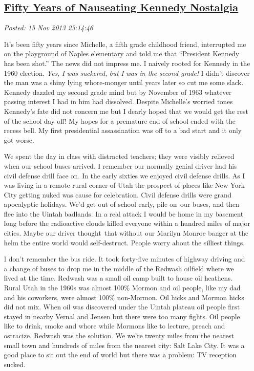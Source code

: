 %

\subsection*{\href{https://bakerjd99.wordpress.com/2013/11/15/fifty-years-of-nauseating-kennedy-nostalgia/}{Fifty Years of Nauseating Kennedy Nostalgia}}


\noindent\emph{Posted: 15 Nov 2013 23:14:46}
\vspace{6pt}

It's been fifty years since Michelle, a fifth grade childhood friend,
interrupted me on the playground of Naples elementary and told me that
``President Kennedy has been shot.'' The news did not impress me. I
naively rooted for Kennedy in the 1960 election. \emph{Yes, I was
suckered, but I was in the second grade!} I didn't discover the man was
a shiny lying whore-monger until years later so cut me some slack.
Kennedy dazzled my second grade mind but by November of 1963 whatever
passing interest I had in him had dissolved. Despite Michelle's worried
tones Kennedy's fate did not concern me but I dearly hoped that we would
get the rest of the school day off! My hopes for a premature end of
school ended with the recess bell. My first presidential assassination was
off to a bad start and it only got worse.

We spent the day in class with distracted teachers; they were visibly
relieved when our school buses arrived. I remember our normally genial
driver had his civil defense drill face on. In the early sixties we
enjoyed civil defense drills. As I was living in a remote rural corner
of Utah the prospect of places like New York City getting nuked was
cause for celebration. Civil defense drills were grand apocalyptic
holidays. We'd get out of school early, pile on~our buses, and then flee
into the Uintah badlands. In a real attack I would be home in my
basement long before the radioactive clouds killed everyone within a
hundred miles of major cities. Maybe our driver thought~that without our
Marilyn Monroe banger at the helm the entire world would self-destruct.
People worry about the silliest things.

I don't remember the bus ride. It took forty-five minutes of highway
driving and a change of buses to drop me in the middle of the Redwash
oilfield where we lived at the time. Redwash was a small oil camp built
to house oil heathens. Rural Utah in the 1960s was almost 100\% Mormon
and oil people, like my dad and his coworkers, were almost 100\%
non-Mormon. Oil hicks and Mormon hicks did not mix. When oil was
discovered under the Uintah plateau oil people first stayed in nearby
Vernal and Jensen but there were too many fights. Oil people like to
drink, smoke and whore while Mormons like to lecture, preach and
ostracize. Redwash was the solution. We we're twenty miles from the
nearest small town and hundreds of miles from the nearest city: Salt
Lake City. It was a good place to sit out the end of world but there was a
problem: TV reception sucked.

